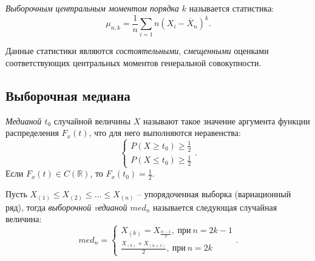 \begin{definition}
  \textit{Выборочным центральным моментом порядка $k$} называется статистика:
  \[
    \mu_{n, k} = \frac{1}{n} \sum\limits_{i = 1}{n} (X_i - \overline{X}_n)^k
  .\]
\end{definition}

Данные статистики являются \textit{состоятельными}, \textit{смещенными} оценками
соответствующих центральных моментов генеральной совокупности.

\subsection{Выборочная медиана}

\begin{definition}
  \textit{Медианой $t_0$} случайной величины $X$ называют такое значение
  аргумента функции распределения $F_x(t)$, что для него выполняются
  неравенства:
  \[
    \begin{cases}
      P(X \geqslant t_0) \geqslant \frac{1}{2}\\
      P(X \leqslant t_0) \geqslant \frac{1}{2}
    \end{cases}
  .\]
  Если $F_x(t) \in C(\mathbb{R})$, то $F_x(t_0) = \frac{1}{2}$.
\end{definition}

\begin{definition}
  Пусть $X_{(1)} \leqslant X_{(2)} \leqslant \ldots \leqslant X_{(n)}$ --
  упорядоченная выборка (вариационный ряд), тогда \textit{выборочной vедианой
  $med_n$} называется следующая случайная величина:
  \[
    med_n = \begin{cases}
      X_{(k)} = X_{\frac{n - 1}{2}},~ \text{при}~ n = 2k - 1\\
      \frac{X_{(k)} + X_{(k + 1)}}{2},~ \text{при}~ n = 2k
    \end{cases}
  .\]
\end{definition}
